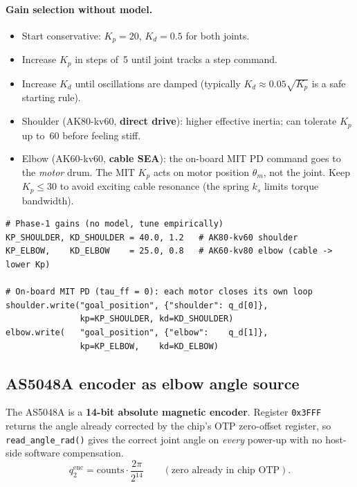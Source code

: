 \documentclass[11pt,a4paper]{article}
\begin{document}
\paragraph{Gain selection without model.}
\begin{itemize}[leftmargin=2em]
  \item Start conservative: $K_p{=}20$, $K_d{=}0.5$ for both joints.
  \item Increase $K_p$ in steps of~5 until joint tracks a step command.
  \item Increase $K_d$ until oscillations are damped (typically
        $K_d \approx 0.05\sqrt{K_p}$ is a safe starting rule).
  \item Shoulder (AK80-kv60, \textbf{direct drive}): higher effective inertia;
        can tolerate $K_p$ up to~60 before feeling stiff.
  \item Elbow (AK60-kv60, \textbf{cable SEA}): the on-board MIT PD command
        goes to the \emph{motor} drum.  The MIT $K_p$ acts on motor position
        $\theta_m$, not the joint.  Keep $K_p\le 30$ to avoid exciting cable
        resonance (the spring $k_s$ limits torque bandwidth).
\end{itemize}

\begin{lstlisting}[caption={Phase~1 gain selection and MIT PD for both joints.}]
# Phase-1 gains (no model, tune empirically)
KP_SHOULDER, KD_SHOULDER = 40.0, 1.2   # AK80-kv60 shoulder
KP_ELBOW,    KD_ELBOW    = 25.0, 0.8   # AK60-kv80 elbow (cable -> lower Kp)

# On-board MIT PD (tau_ff = 0): each motor closes its own loop
shoulder.write("goal_position", {"shoulder": q_d[0]},
               kp=KP_SHOULDER, kd=KD_SHOULDER)
elbow.write(   "goal_position", {"elbow":    q_d[1]},
               kp=KP_ELBOW,    kd=KD_ELBOW)
\end{lstlisting}

\subsection{AS5048A encoder as elbow angle source}

The AS5048A is a \textbf{14-bit absolute magnetic encoder}.
Register \texttt{0x3FFF} returns the angle already corrected by the chip's
OTP zero-offset register, so \texttt{read\_angle\_rad()} gives the
correct joint angle on \emph{every} power-up with no host-side software
compensation.
\begin{equation}
  q_2^{\mathrm{enc}} = \mathrm{counts} \cdot \frac{2\pi}{2^{14}}
  \qquad (\text{zero already in chip OTP}).
  \label{eq:enc}
\end{equation}
\end{document}
